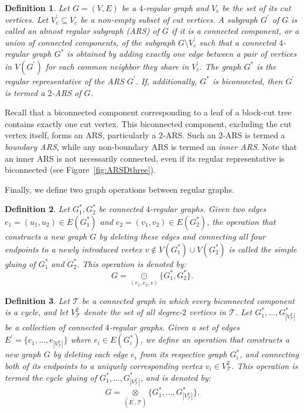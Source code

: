 \documentclass{article}
\newtheorem{definition}{Definition}
\begin{document}
        \begin{definition}\label{def:ARS}
            Let $G=(V,E)$ be a $4$-regular graph and $V_c$ be the set of its cut vertices. 
            Let $V_c^{\prime} \subseteq V_c$ be a non-empty subset of cut vertices. 
            A subgraph $G^{\prime}$ of $G$ is called an \emph{almost regular subgraph (ARS)} of $G$ if it is a connected component, or a union of connected components, of the subgraph $G\setminus V_c^{\prime}$ such that a connected $4$-regular graph $G^*$ is obtained by adding exactly one edge between a pair of vertices in $V(G^{\prime})$ for each common neighbor they share in $V_c^{\prime}$.
            The graph $G^*$ is the \emph{regular representative} of the ARS $G^{\prime}$.
            If, additionally, $G^*$ is biconnected, then $G^\prime$ is termed a \emph{$2$-ARS} of $G$.
        \end{definition}
        
        Recall that a biconnected component corresponding to a leaf of a block-cut tree contains exactly one cut vertex.
        This biconnected component, excluding the cut vertex itself, forms an ARS, particularly a $2$-ARS.
        Such an $2$-ARS is termed a \emph{boundary ARS}, while any non-boundary ARS is termed an \emph{inner ARS}.
        Note that an inner ARS is not necessarily connected, even if its regular representative is biconnected (see Figure~\ref{fig:ARSDthree}).

        Finally, we define two graph operations between regular graphs.

        \begin{definition}\label{def:glue_simple}
            Let $G^*_1, G^*_2$ be connected $4$-regular graphs.
            Given two edges $e_1=(u_{1},u_{2})\in E(G^*_1)$ and $e_2=(v_{1},v_{2})\in E(G^*_2)$, the operation that constructs a new graph $G$ by deleting these edges and connecting all four endpoints to a newly introduced vertex $v\notin V(G^*_1) \cup V(G^*_2)$ is called the \emph{simple gluing} of $G^*_1$ and $G^*_2$.
            This operation is denoted by:
            $$ G=  \underset{(e_1,e_2,v)}{\odot} \{G^*_1,G^*_2\}. $$
        \end{definition}
        
        \begin{definition}\label{def:glue_cycle}
            Let $\mathcal{T}$ be a connected graph in which every biconnected component is a cycle, and let $V^2_{\mathcal{T}}$ denote the set of all degree-$2$ vertices in $\mathcal{T}$.
            Let $G^*_1, \dots, G_{|V^2_{\mathcal{T}}|}^*$ be a collection of connected $4$-regular graphs.
            Given a set of edges $E^\prime= \{e_1, \dots, e_{|V^2_{\mathcal{T}}|}\}$ where $e_i\in E(G^*_i)$, we define an operation that constructs a new graph $G$ by deleting each edge $e_i$ from its respective graph $G^*_i$, and connecting both of its endpoints to a uniquely corresponding vertex $v_i\in V^2_{\mathcal{T}}$.
            This operation is termed the \emph{cycle gluing} of $G^*_1, \dots, G_{|V^2_{\mathcal{T}}|}^*$, and is denoted by:
            $$ G=  \underset{(E^\prime, \mathcal{T})}{\otimes} \{G^*_1,\dots, G^*_{|V^2_{\mathcal{T}}|}\}. $$
        \end{definition}
\end{document}
